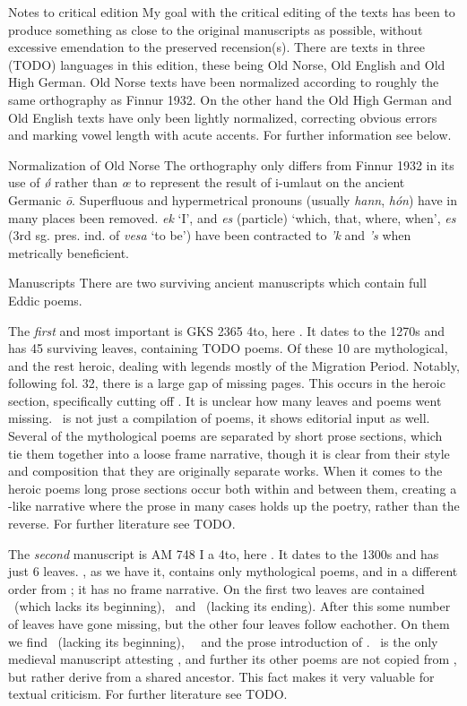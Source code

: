 Notes to critical edition
  My goal with the critical editing of the texts has been to produce something as close to the original manuscripts as possible, without excessive emendation to the preserved recension(s). There are texts in three (TODO) languages in this edition, these being Old Norse, Old English and Old High German. Old Norse texts have been normalized according to roughly the same orthography as Finnur 1932. On the other hand the Old High German and Old English texts have only been lightly normalized, correcting obvious errors and marking vowel length with acute accents. For further information see below.

  Normalization of Old Norse
    The orthography only differs from Finnur 1932 in its use of \emph{ǿ} rather than \emph{œ} to represent the result of i-umlaut on the ancient Germanic \emph{ō}.
    Superfluous and hypermetrical pronouns (usually \emph{hann}, \emph{hón}) have in many places been removed. \emph{ek} ‘I’, and \emph{es} (particle) ‘which, that, where, when’, \emph{es} (3rd sg. pres. ind. of \emph{vesa} ‘to be’) have been contracted to \emph{’k} and \emph{’s} when metrically beneficient.

  Manuscripts
    There are two surviving ancient manuscripts which contain full Eddic poems.

    The \emph{first} and most important is GKS 2365 4to, here \Regius. It dates to the 1270s and has 45 surviving leaves, containing TODO poems. Of these 10 are mythological, and the rest heroic, dealing with legends mostly of the Migration Period. Notably, following fol. 32, there is a large gap of missing pages. This occurs in the heroic section, specifically cutting off \Sigrdrifumal. It is unclear how many leaves and poems went missing.
    \Regius\ is not just a compilation of poems, it shows editorial input as well. Several of the mythological poems are separated by short prose sections, which tie them together into a loose frame narrative, though it is clear from their style and composition that they are originally separate works. When it comes to the heroic poems long prose sections occur both within and between them, creating a -like narrative where the prose in many cases holds up the poetry, rather than the reverse. For further literature see TODO.

    The \emph{second} manuscript is AM 748 I a 4to, here \AM. It dates to the 1300s and has just 6 leaves. \AM, as we have it, contains only mythological poems, and in a different order from \Regius; it has no frame narrative. On the first two leaves are contained \Harbardsljod\ (which lacks its beginning), \Baldrsdraumar\ and \Skirnismal\ (lacking its ending). After this some number of leaves have gone missing, but the other four leaves follow eachother. On them we find \Vafthrudnismal\ (lacking its beginning), \Grimnismal\, \Hymiskvida\ and the prose introduction of \Volundarkvida. \AM\ is the only medieval manuscript attesting \Baldrsdraumar, and further its other poems are not copied from \Regius, but rather derive from a shared ancestor. This fact makes it very valuable for textual criticism. For further literature see TODO.

